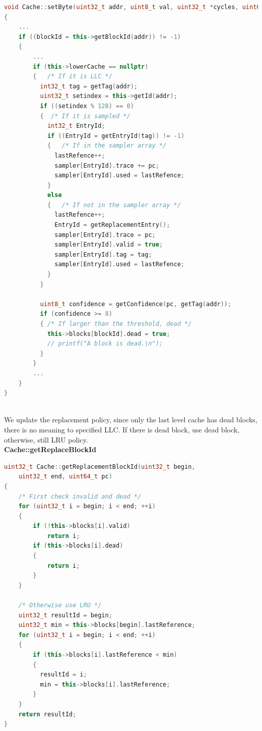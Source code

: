\documentclass{article}
\begin{document}
\begin{lstlisting}[language=c++]
void Cache::setByte(uint32_t addr, uint8_t val, uint32_t *cycles, uint64_t pc)
{
    ...
    if ((blockId = this->getBlockId(addr)) != -1)
    {
        ...
        if (this->lowerCache == nullptr)
        {   /* If it is LLC */
          int32_t tag = getTag(addr);
          uint32_t setindex = this->getId(addr);
          if ((setindex % 128) == 0)
          {  /* If it is sampled */
            int32_t EntryId;
            if ((EntryId = getEntryId(tag)) != -1)
            {   /* If in the sampler array */
              lastRefence++;
              sampler[EntryId].trace += pc;
              sampler[EntryId].used = lastRefence;
            }
            else
            {   /* If not in the sampler array */
              lastRefence++;
              EntryId = getReplacementEntry();
              sampler[EntryId].trace = pc;
              sampler[EntryId].valid = true;
              sampler[EntryId].tag = tag;
              sampler[EntryId].used = lastRefence;
            }
          }
    
          uint8_t confidence = getConfidence(pc, getTag(addr));
          if (confidence >= 8)
          { /* If larger than the threshold, dead */
            this->blocks[blockId].dead = true;
            // printf("A block is dead.\n");
          }
        }
        ...
    }
}
  
\end{lstlisting}
We update the replacement policy, since only the last level cache has dead blocks, there is no meaning to specified LLC. If there is dead block, use dead block, otherwise, still LRU policy.\\
\textbf{Cache::getReplaceBlockId}
\begin{lstlisting}[language=c++]
uint32_t Cache::getReplacementBlockId(uint32_t begin, 
    uint32_t end, uint64_t pc)
{
    /* First check invalid and dead */
    for (uint32_t i = begin; i < end; ++i)
    {
        if (!this->blocks[i].valid)
            return i;
        if (this->blocks[i].dead)
        {
            return i;
        }
    }
    
    /* Otherwise use LRU */
    uint32_t resultId = begin;
    uint32_t min = this->blocks[begin].lastReference;
    for (uint32_t i = begin; i < end; ++i)
    {
        if (this->blocks[i].lastReference < min)
        {
          resultId = i;
          min = this->blocks[i].lastReference;
        }
    }
    return resultId;
}
    
\end{lstlisting}
\end{document}
